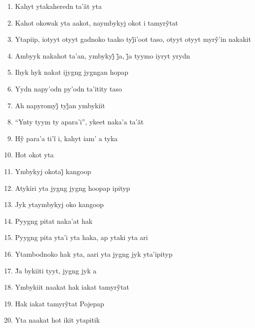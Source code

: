 \begin{enumerate}
 \item Kahyt ytakaheredn ta'ãt yta

 \item Kahot okowak yta aakot, naymbykyj okot i tamyrỹtat

 \item Ytapiip, iotyyt otyyt gadnoko taako tyj̃i’oot taso, otyyt otyyt myrỹ’in nakakit

 \item Ambyyk nakahot ta’an, ymbykyj̃ j̃a, j̃a tyymo iyryt yrydn

 \item Ihyk hyk nakat ijygng jygngan hopap

 \item Yydn napy'odn py'odn ta'itity taso

 \item Ah napyromyj̃ tyj̃an ymbykiit

 \item ``Ynty tyym ty apara'i'', ykeet naka'a ta'ãt

 \item Hỹ para’a ti’ĩ i, kahyt iam’ a tyka

 \item Hot okot yta

 \item Ymbykyj okotaj̃ kangoop

 \item Atykiri yta jygng jygng hoopap ipityp

 \item Jyk ytaymbykyj oko kangoop

 \item Pyygng pitat naka'at hak

 \begin{center}\end{center}

 \item Pyygng pita yta'i yta haka, ap ytaki yta ari

 \item Ytambodnoko hak yta, aari yta jygng jyk yta'ipityp

 \item J̃a bykiiti tyyt, jygng jyk a

 \item Ymbykiit naakat hak iakat tamyrỹtat

 \item Hak iakat tamyrỹtat Pojepap

 \item Yta naakat hot ikit ytapitik


\end{enumerate}
